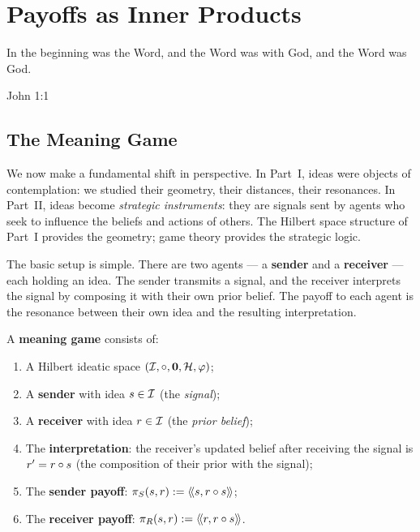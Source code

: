 \chapter{Payoffs as Inner Products}
\label{ch:payoffs}

\epigraph{In the beginning was the Word, and the Word was with God, and the
Word was God.}{John 1:1}

\section{The Meaning Game}

We now make a fundamental shift in perspective. In Part~I, ideas were objects
of contemplation: we studied their geometry, their distances, their resonances.
In Part~II, ideas become \emph{strategic instruments}: they are signals sent by
agents who seek to influence the beliefs and actions of others. The Hilbert
space structure of Part~I provides the geometry; game theory provides the
strategic logic.

The basic setup is simple. There are two agents --- a \textbf{sender} and a
\textbf{receiver} --- each holding an idea. The sender transmits a signal, and
the receiver interprets the signal by composing it with their own prior belief.
The payoff to each agent is the resonance between their own idea and the
resulting interpretation.

\begin{definition}
\label{def:meaning-game}
A \textbf{meaning game} consists of:
\begin{enumerate}
\item A Hilbert ideatic space $(\mathcal{I}, \circ, \mathbf{0}, \mathcal{H}, \varphi)$;
\item A \textbf{sender} with idea $s \in \mathcal{I}$ (the \emph{signal});
\item A \textbf{receiver} with idea $r \in \mathcal{I}$ (the \emph{prior belief});
\item The \textbf{interpretation}: the receiver's updated belief after receiving
the signal is $r' = r \circ s$ (the composition of their prior with the
signal);
\item The \textbf{sender payoff}: $\pi_{S}(s, r) := \langle\!\langle s, r \circ s \rangle\!\rangle$;
\item The \textbf{receiver payoff}: $\pi_{R}(s, r) := \langle\!\langle r, r \circ s \rangle\!\rangle$.
\end{enumerate}
\end{definition}

